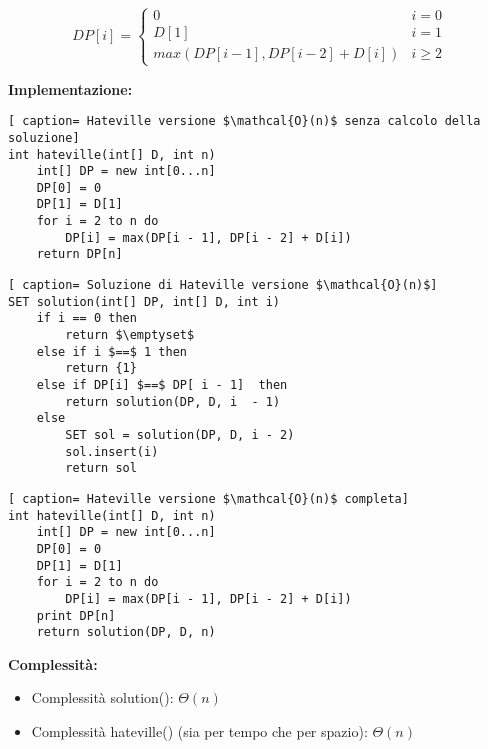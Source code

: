 \documentclass[../cheatSheetAlgoritmi.tex]{subfiles}
\begin{document}
\begin{equation*}
  	DP[i] =\begin{cases}
    	0 & \text{$i = 0$}\\
    	D[1] & \text{$i = 1$}\\
    	max(DP[i -1], DP[i-2]+D[i]) & \text{$i \ge 2$}
  	\end{cases}
\end{equation*} 

\bigskip

\textbf{Implementazione:}
\begin{lstlisting}[ caption= Hateville versione $\mathcal{O}(n)$ senza calcolo della soluzione]
int hateville(int[] D, int n)
	int[] DP = new int[0...n]
	DP[0] = 0
	DP[1] = D[1]
	for i = 2 to n do
		DP[i] = max(DP[i - 1], DP[i - 2] + D[i])
	return DP[n]
\end{lstlisting}

\begin{lstlisting}[ caption= Soluzione di Hateville versione $\mathcal{O}(n)$]
SET solution(int[] DP, int[] D, int i)
	if i == 0 then
		return $\emptyset$
	else if i $==$ 1 then
		return {1}
	else if DP[i] $==$ DP[ i - 1]  then
		return solution(DP, D, i  - 1)
	else
		SET sol = solution(DP, D, i - 2)
		sol.insert(i)
		return sol
\end{lstlisting}

\begin{lstlisting}[ caption= Hateville versione $\mathcal{O}(n)$ completa]
int hateville(int[] D, int n)
	int[] DP = new int[0...n]
	DP[0] = 0
	DP[1] = D[1]
	for i = 2 to n do
		DP[i] = max(DP[i - 1], DP[i - 2] + D[i])
	print DP[n]
	return solution(DP, D, n)
\end{lstlisting}
\textbf{Complessità:}  
\begin{itemize}
	\item Complessità solution(): $\Theta(n)$
	\item Complessità hateville() (sia per tempo che per spazio): $\Theta(n)$
\end{itemize}
\end{document}
